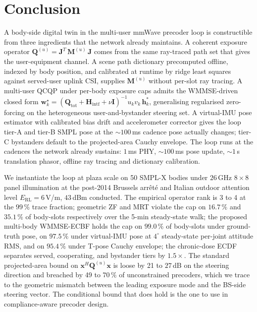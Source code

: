 \documentclass[journal,twocolumn,10pt]{IEEEtran}
\theoremstyle{plain}
\theoremstyle{remark}
\newcommand{\xx}{\mathbf{x}}
\newcommand{\hh}{\mathbf{h}}
\newcommand{\ww}{\mathbf{w}}
\newcommand{\Qmat}{\mathbf{Q}}
\newcommand{\Mmat}{\mathbf{M}}
\newcommand{\Hintf}{\mathbf{H}_{\mathrm{intf}}}
\newcommand{\Jmat}{\mathbf{J}}
\begin{document}
\section{Conclusion}\label{sec:conclusion}

A body-side digital twin in the multi-user mmWave precoder loop is
constructible from three ingredients that the network already
maintains. A coherent exposure operator
$\Qmat^{(u)} = \Jmat^T\,\Mmat^{(u)}\,\Jmat$ comes from the same
ray-traced path set that gives the user-equipment channel. A scene
path dictionary precomputed offline, indexed by body position, and
calibrated at runtime by ridge least squares against served-user
uplink CSI, supplies $\Mmat^{(u)}$ without per-slot ray tracing. A
multi-user QCQP under per-body exposure caps admits the WMMSE-driven
closed form
$\ww_k^\star = (\Qmat_{\mathrm{tot}} + \Hintf + \nu \mathbf{I})^{-1}
u_k v_k\,\hh_k^*$, generalising regularised zero-forcing on the
heterogeneous user-and-bystander steering set. A virtual-IMU pose
estimator with calibrated bias drift and accelerometer corrector
gives the loop tier-A and tier-B SMPL pose at the
$\sim 100\,$ms cadence pose actually changes; tier-C bystanders
default to the projected-area Cauchy envelope. The loop runs at the
cadences the network already sustains: $1\,$ms PHY, $\sim 100\,$ms
pose update, $\sim 1\,$s translation phasor, offline ray tracing
and dictionary calibration.

We instantiate the loop at plaza scale on 50 SMPL-X bodies under
$26\,$GHz $8 \times 8$ panel illumination at the post-2014 Brussels
arr\^et\'e and Italian outdoor attention level
$E_{\mathrm{RL}} = 6\,$V/m, $43\,$dBm conducted. The empirical
operator rank is 3 to 4 at the $99\,\%$ trace fraction; geometric
ZF and MRT violate the cap on $16.7\,\%$ and $35.1\,\%$ of
body-slots respectively over the 5-min steady-state walk; the
proposed multi-body WMMSE-ECBF holds the cap on $99.0\,\%$ of
body-slots under ground-truth pose, on $97.5\,\%$ under virtual-IMU
pose at $4^\circ$ steady-state per-joint attitude RMS, and on
$95.4\,\%$ under T-pose Cauchy envelope; the chronic-dose
ECDF separates served, cooperating, and bystander tiers by
$1.5\times$. The standard projected-area bound on
$\xx^H \Qmat^{(u)} \xx$ is loose by 21 to $27\,$dB on the steering
direction and breached by 49 to $70\,\%$ of unconstrained
precoders, which we trace to the geometric mismatch between the
leading exposure mode and the BS-side steering vector. The
conditional bound that does hold is the one to use in
compliance-aware precoder design.
\end{document}
